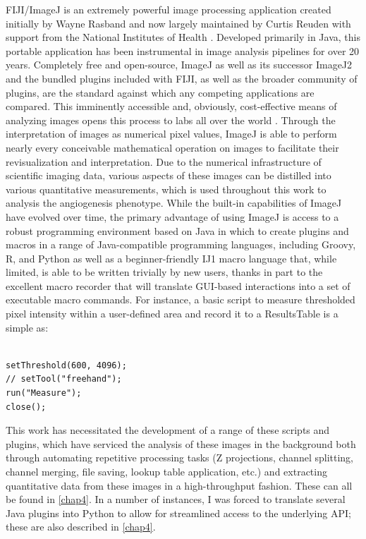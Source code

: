 FIJI/ImageJ is an extremely powerful image processing application created initially by Wayne Rasband and now largely maintained by Curtis Reuden with support from the National Institutes of Health \citep{Schneider2012}. Developed primarily in Java, this portable application has been instrumental in image analysis pipelines for over 20 years. Completely free and open\hyp{}source, ImageJ as well as its successor ImageJ2 and the bundled plugins included with FIJI, as well as the broader community of plugins, are the standard against which any competing applications are compared. This imminently accessible and, obviously, cost\hyp{}effective means of analyzing images opens this process to labs all over the world \citep{Girish2004}. Through the interpretation of images as numerical pixel values, ImageJ is able to perform nearly every conceivable mathematical operation on images to facilitate their revisualization and interpretation. Due to the numerical infrastructure of scientific imaging data, various aspects of these images can be distilled into various quantitative measurements, which is used throughout this work to analysis the angiogenesis phenotype. While the built\hyp{}in capabilities of ImageJ have evolved over time, the primary advantage of using ImageJ is access to a robust programming environment based on Java in which to create plugins and macros in a range of Java\hyp{}compatible programming languages, including Groovy, R, and Python as well as a beginner\hyp{}friendly IJ1 macro language that, while limited, is able to be written trivially by new users, thanks in part to the excellent macro recorder that will translate GUI\hyp{}based interactions into a set of executable macro commands. For instance, a basic script to measure thresholded pixel intensity within a user\hyp{}defined area and record it to a ResultsTable is a simple as:
 
\begin{lstlisting}

setThreshold(600, 4096);
// setTool("freehand");
run("Measure");
close();

\end{lstlisting}

This work has necessitated the development of a range of these scripts and plugins, which have serviced the analysis of these images in the background both through automating repetitive processing tasks (Z projections, channel splitting, channel merging, file saving, lookup table application, etc.) and extracting quantitative data from these images in a high\hyp{}throughput fashion. These can all be found in \autoref{chap4}. In a number of instances, I was forced to translate several Java plugins into Python to allow for streamlined access to the underlying API; these are also described in \autoref{chap4}.

